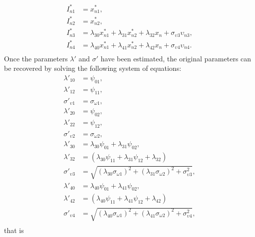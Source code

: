 \documentclass[12pt,a4paper]{article}
\begin{document}
\[
\begin{aligned}
I^*_{n1} &= x_{n1}^*, \\
I^*_{n2} &= x_{n2}^*, \\
I^*_{n3} &= \lambda_{30}  x_{n1}^* + \lambda_{31}  x_{n2}^* +\lambda_{32} x_{n} + \sigma_{\upsilon 3} \upsilon_{n3}, \\
I^*_{n4} &= \lambda_{40}  x_{n1}^* + \lambda_{41}  x_{n2}^* +\lambda_{42} x_{n} + \sigma_{\upsilon 4} \upsilon_{n4}. \\
\end{aligned}
\]
Once the parameters $\lambda'$ and $\sigma'$ have been estimated, the original parameters can be recovered by solving the following system of equations:
\[
\begin{aligned}
  \lambda'_{10} &= \psi_{01}, \\
  \lambda'_{12} &= \psi_{11}, \\
  \sigma'_{\upsilon 1} &= \sigma_{\omega 1}, \\
  \lambda'_{20} &= \psi_{02}, \\
  \lambda'_{22} &= \psi_{12}, \\
  \sigma'_{\upsilon 2} &= \sigma_{\omega 2}, \\
  \lambda'_{30} &= \lambda_{30}  \psi_{01}+ \lambda_{31} \psi_{02}, \\
  \lambda'_{32} &= (\lambda_{30}\psi_{11}+ \lambda_{31} \psi_{12} +\lambda_{32}) \\
  \sigma'_{\upsilon 3} &= \sqrt{(\lambda_{30}\sigma_{\omega 1})^ 2 + (\lambda_{31} \sigma_{\omega 2})^2 + \sigma^2_{\upsilon 3}}, \\
  \lambda'_{40} &= \lambda_{40}  \psi_{01}+ \lambda_{41} \psi_{02}, \\
  \lambda'_{42} &= (\lambda_{40}\psi_{11}+ \lambda_{41} \psi_{12} +\lambda_{42}) \\
  \sigma'_{\upsilon 4} &= \sqrt{(\lambda_{40}\sigma_{\omega 1})^ 2 + (\lambda_{41} \sigma_{\omega 2})^2 + \sigma^2_{\upsilon 4}}, \\
\end{aligned}
\]
that is
\end{document}
